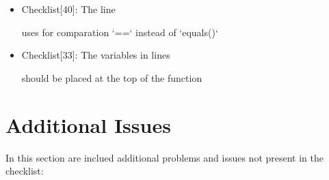 \documentclass[11pt,titlepage]{article} %
\begin{document}
\begin{itemize}
    
   \item Checklist[40]: The line
    
    uses for comparation `==` instead of `equals()`
   \item Checklist[33]: The variables in lines
    
    should be placed at the top of the function

  \end{itemize}
\newpage
\section{Additional Issues}
  In this section are inclued additional problems and issues not present in the checklist:
\end{document}

